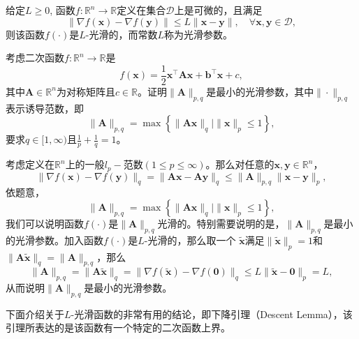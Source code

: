 \begin{definition}[$L$-光滑]
    给定$L \geq 0$, 函数$f: \mathbb{R}^{n} \rightarrow \mathbb{R}$定义在集合$\mathcal{D}$上是可微的，且满足
\begin{equation}
    \|\nabla f(\bm{x})-\nabla f(\bm{y})\| \leq L\|\bm{x}-\bm{y}\|, \quad \forall \bm{x}, \bm{y} \in \mathcal{D},
    \nonumber
\end{equation}
则该函数$f(\cdot)$是$L$-光滑的，而常数$L$称为光滑参数。
\end{definition}

\begin{problem}[二次函数的$L$-光滑]
    考虑二次函数$f: \mathbb{R}^{n} \rightarrow \mathbb{R}$是
    \begin{equation}
        f(\bm{x})=\frac{1}{2} \bm{x}^{\top} \bm{A} \bm{x}+\bm{b}^{\top} \bm{x}+c,
        \nonumber
    \end{equation}
其中$\bm{A} \in \mathbb{R}^{n}$为对称矩阵且$c \in \mathbb{R}$。证明$\|\bm{A}\|_{p, q}$是最小的光滑参数，其中$\|\cdot\|_{p, q}$表示诱导范数，即
    \begin{equation}
        \|\bm{A}\|_{p, q}=\max \left\{\|\bm{A} \bm{x}\|_{q} \mid\|\bm{x}\|_{p} \leq 1\right\},
        \nonumber
    \end{equation}
要求$q \in[1, \infty)$且$\frac{1}{p}+\frac{1}{q}=1$。
\end{problem}
\begin{solution}
    考虑定义在$\mathbb{R}^{n}$上的一般$l_{p} -$范数$(1 \leq p \leq \infty)$。那么对任意的$\bm{x}, \bm{y} \in \mathbb{R}^{n}$，
    \begin{equation}
        \|\nabla f(\bm{x})-\nabla f(\bm{y})\|_{q}=\|\bm{A} \bm{x}-\bm{A} \bm{y}\|_{q} \leq\|\bm{A}\|_{p, q}\|\bm{x}-\bm{y}\|_{p},
        \nonumber
    \end{equation}
    依题意，
    \begin{equation}
        \|\bm{A}\|_{p, q}=\max \left\{\|\bm{A} \bm{x}\|_{q} \mid\|\bm{x}\|_{p} \leq 1\right\},
        \nonumber
    \end{equation}
    我们可以说明函数$f(\cdot)$是$\|\bm{A}\|_{p, q}$光滑的。特别需要说明的是，$\|\bm{A}\|_{p, q}$是最小的光滑参数。加入函数$f(\cdot)$是$L $-光滑的，那么取一个 $\tilde{\bm{x}}$满足$\|\tilde{\bm{x}}\|_{p}=1$和$ \|\bm{A} \tilde{\bm{x}}\|_{q}=\|\bm{A}\|_{p, q}$，那么
    \begin{equation}
        \|\bm{A}\|_{p, q}=\|\bm{A} \tilde{\bm{x}}\|_{q}=\|\nabla f(\tilde{\bm{x}})-\nabla f(\mathbf{0})\|_{q} \leq L\|\tilde{\bm{x}}-\mathbf{0}\|_{p}=L,
        \nonumber
    \end{equation}
从而说明$\|\bm{A}\|_{p, q}$是最小的光滑参数。
\end{solution}
\par 下面介绍关于$L$-光滑函数的非常有用的结论，即下降引理（Descent Lemma）\cite{2006NumericalOptmizationBook}，该引理所表达的是该函数有一个特定的二次函数上界。


